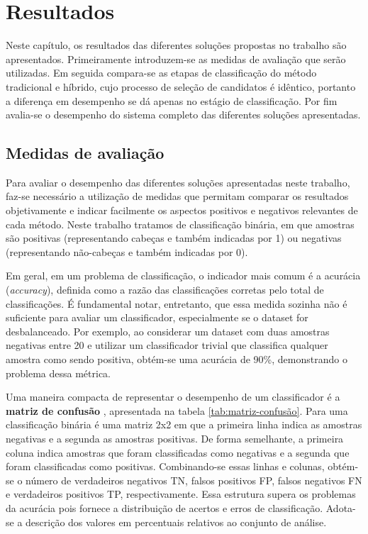 \chapter{Resultados} \label{chap:resultados}
Neste capítulo, os resultados das diferentes soluções propostas no trabalho são apresentados. Primeiramente introduzem-se as medidas de avaliação que serão utilizadas. Em seguida compara-se as etapas de classificação do método tradicional e híbrido, cujo processo de seleção de candidatos é idêntico, portanto a diferença em desempenho se dá apenas no estágio de classificação. Por fim avalia-se o desempenho do sistema completo das diferentes soluções apresentadas.

\section{Medidas de avaliação}
Para avaliar o desempenho das diferentes soluções apresentadas neste trabalho, faz-se necessário a utilização de medidas que permitam comparar os resultados objetivamente e indicar facilmente os aspectos positivos e negativos relevantes de cada método. Neste trabalho tratamos de classificação binária, em que amostras são positivas (representando cabeças e também indicadas por 1) ou negativas (representando não-cabeças e também indicadas por 0). 

Em geral, em um problema de classificação, o indicador mais comum é a acurácia (\textit{accuracy}), definida \cite{evaluationMetrics} como a razão das classificações corretas pelo total de classificações. É fundamental notar, entretanto, que essa medida sozinha não é suficiente para avaliar um classificador, especialmente se o dataset for desbalanceado. Por exemplo, ao considerar um dataset com duas amostras negativas entre 20 e utilizar um classificador trivial que classifica qualquer amostra como sendo positiva, obtém-se uma acurácia de 90\%, demonstrando o problema dessa métrica.

Uma maneira compacta de representar o desempenho de um classificador é a \textbf{matriz de confusão} \cite{evaluationMetrics}, apresentada na tabela \ref{tab:matriz-confusão}. Para uma classificação binária é uma matriz 2x2 em que a primeira linha indica as amostras negativas e a segunda as amostras positivas. De forma semelhante, a primeira coluna indica amostras que foram classificadas como negativas e a segunda que foram classificadas como positivas. Combinando-se essas linhas e colunas, obtém-se o número de verdadeiros negativos TN, falsos positivos FP, falsos negativos FN e verdadeiros positivos TP, respectivamente. Essa estrutura supera os problemas da acurácia pois fornece a distribuição de acertos e erros de classificação. Adota-se a descrição dos valores em percentuais relativos ao conjunto de análise.

